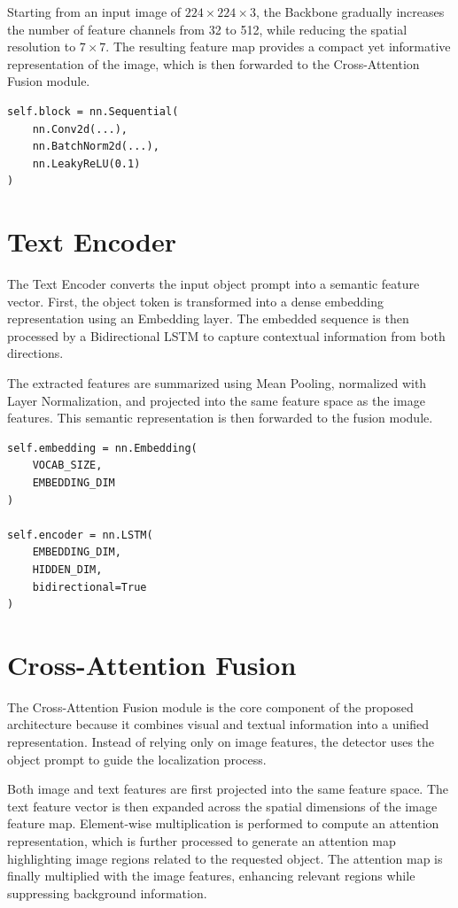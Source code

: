 \documentclass[a4paper,12pt]{report}
\begin{document}
Starting from an input image of $224 \times 224 \times 3$, the Backbone
gradually increases the number of feature channels from 32 to 512, while
reducing the spatial resolution to $7 \times 7$. The resulting feature map
provides a compact yet informative representation of the image, which is
then forwarded to the Cross-Attention Fusion module.

\begin{lstlisting}[caption={Backbone Convolution Block}, label={lst:tgod-backbone-block}]
self.block = nn.Sequential(
    nn.Conv2d(...),
    nn.BatchNorm2d(...),
    nn.LeakyReLU(0.1)
)
\end{lstlisting}

\section{Text Encoder}
\label{sec:tgod-text-encoder}

The Text Encoder converts the input object prompt into a semantic feature
vector. First, the object token is transformed into a dense embedding
representation using an Embedding layer. The embedded sequence is then
processed by a Bidirectional LSTM to capture contextual information from
both directions.

The extracted features are summarized using Mean Pooling, normalized with
Layer Normalization, and projected into the same feature space as the
image features. This semantic representation is then forwarded to the
fusion module.

\begin{lstlisting}[caption={Text encoding}, label={lst:tgod-text-encoding}]
self.embedding = nn.Embedding(
    VOCAB_SIZE,
    EMBEDDING_DIM
)

self.encoder = nn.LSTM(
    EMBEDDING_DIM,
    HIDDEN_DIM,
    bidirectional=True
)
\end{lstlisting}

\section{Cross-Attention Fusion}
\label{sec:tgod-cross-attention}

The Cross-Attention Fusion module is the core component of the proposed
architecture because it combines visual and textual information into a
unified representation. Instead of relying only on image features, the
detector uses the object prompt to guide the localization process.

Both image and text features are first projected into the same feature
space. The text feature vector is then expanded across the spatial
dimensions of the image feature map. Element-wise multiplication is
performed to compute an attention representation, which is further
processed to generate an attention map highlighting image regions related
to the requested object. The attention map is finally multiplied with the
image features, enhancing relevant regions while suppressing background
information.
\end{document}

